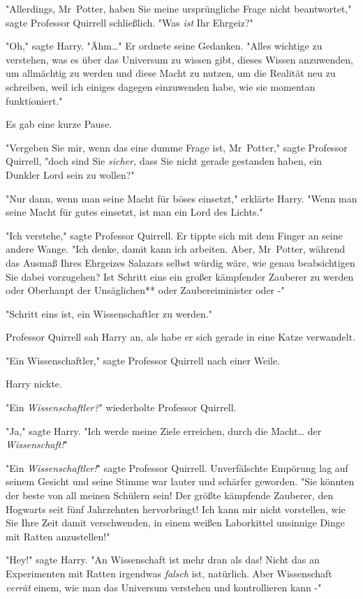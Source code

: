 {"Allerdings, Mr~Potter, haben Sie meine ursprüngliche Frage nicht beantwortet," sagte Professor Quirrell schließlich. "Was \emph{ist} Ihr Ehrgeiz?"

"Oh," sagte Harry. "Ähm…" Er ordnete seine Gedanken. "Alles wichtige zu verstehen, was es über das Universum zu wissen gibt, dieses Wissen anzuwenden, um allmächtig zu werden und diese Macht zu nutzen, um die Realität neu zu schreiben, weil ich einiges dagegen einzuwenden habe, wie sie momentan funktioniert."

Es gab eine kurze Pause.

"Vergeben Sie mir, wenn das eine dumme Frage ist, Mr~Potter," sagte Professor Quirrell, "doch sind Sie \emph{sicher,} dass Sie nicht gerade gestanden haben, ein Dunkler Lord sein zu wollen?"

"Nur dann, wenn man seine Macht für böses einsetzt," erklärte Harry. "Wenn man seine Macht für gutes einsetzt, ist man ein Lord des Lichts."

"Ich verstehe," sagte Professor Quirrell. Er tippte sich mit dem Finger an seine andere Wange. "Ich denke, damit kann ich arbeiten. Aber, Mr~Potter, während das Ausmaß Ihres Ehrgeizes Salazars selbst würdig wäre, wie genau beabsichtigen Sie dabei vorzugehen? Ist Schritt eins ein großer kämpfender Zauberer zu werden oder Oberhaupt der Unsäglichen** oder Zaubereiminister oder -"

"Schritt eins ist, ein Wissenschaftler zu werden."

Professor Quirrell sah Harry an, als habe er sich gerade in eine Katze verwandelt.

"Ein Wissenschaftler," sagte Professor Quirrell nach einer Weile.

Harry nickte.

"Ein \emph{Wissenschaftler?}" wiederholte Professor Quirrell.

"Ja," sagte Harry. "Ich werde meine Ziele erreichen, durch die Macht… der \emph{Wissenschaft!}"

"Ein \emph{Wissenschaftler!}" sagte Professor Quirrell. Unverfälschte Empörung lag auf seinem Gesicht und seine Stimme war lauter und schärfer geworden. "Sie könnten der beste von all meinen Schülern sein! Der größte kämpfende Zauberer, den Hogwarts seit fünf Jahrzehnten hervorbringt! Ich kann mir nicht vorstellen, wie Sie Ihre Zeit damit verschwenden, in einem weißen Laborkittel unsinnige Dinge mit Ratten anzustellen!"

"Hey!" sagte Harry. "An Wissenschaft ist mehr dran als das! Nicht das an Experimenten mit Ratten irgendwas \emph{falsch} ist, natürlich. Aber Wissenschaft \emph{verrät} einem, wie man das Universum verstehen und kontrollieren kann -"

}
